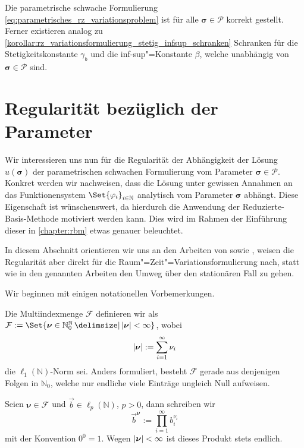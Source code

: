 \documentclass[../main.tex]{subfiles}
\begin{document}
\begin{Korollar}
\label{korollar:parametrisches_rz_variationsproblem_sachgemaess}
    Die parametrische schwache Formulierung \cref{eq:parametrisches_rz_variationsproblem} ist für alle $\bm\sigma \in \mathcal P$ korrekt gestellt.
    Ferner existieren analog zu \cref{korollar:rz_variationsformulierung_stetig_infsup_schranken} Schranken für die Stetigkeitskonstante $\gamma_{b}$ und die inf-sup"=Konstante $\beta$, welche unabhängig von $\bm \sigma \in \mathcal P$ sind.
\end{Korollar}


\section{Regularität bezüglich der Parameter} %
\label{section:regularitaet_bezueglich_der_parameter}

Wir interessieren uns nun für die Regularität der Abhängigkeit der Lösung $u(\bm\sigma)$ der parametrischen schwachen Formulierung vom Parameter $\bm \sigma \in \mathcal P$.
Konkret werden wir nachweisen, dass die Lösung unter gewissen Annahmen an das Funktionensystem $\Set{\varphi_{i}}_{i \in \mathbb{N}}$ analytisch vom Parameter $\bm \sigma$ abhängt.
Diese Eigenschaft ist wünschenswert, da hierdurch die Anwendung der Reduzierte-Basis-Methode motiviert werden kann.
Dies wird im Rahmen der Einführung dieser in \cref{chapter:rbm} etwas genauer beleuchtet.

In diesem Abschnitt orientieren wir uns an den Arbeiten von \textcite{Cohen:2010kz,Cohen:2011jp} sowie \textcite{Kunoth:2013ef}, weisen die Regularität aber direkt für die Raum"=Zeit"=Variationsformulierung nach, statt wie in den genannten Arbeiten den Umweg über den stationären Fall zu gehen.

Wir beginnen mit einigen notationellen Vorbemerkungen.
\begin{Bemerkung}
    Die Multiindexmenge $\mathcal F$ definieren wir als $\mathcal F := \Set{ \bm\nu \in \mathbb{N}^{\mathbb{N}}_{0} \given \abs{\bm\nu} < \infty }$, wobei
    \begin{equation}
        \lvert\bm\nu\rvert := \sum_{i = 1}^{\infty} \nu_{i}
    \end{equation}
    die $\ell_{1}(\mathbb{N})$-Norm sei.
    Anders formuliert, besteht $\mathcal F$ gerade aus denjenigen Folgen in $\mathbb{N}_{0}$, welche nur endliche viele Einträge ungleich Null aufweisen.

    Seien $\bm\nu \in \mathcal F$ und $\vec{b} \in \ell_{p}(\mathbb{N})$, $p > 0$, dann schreiben wir
    \begin{equation}
        \vec{b}^{\bm\nu} := \prod_{i = 1}^{\infty} b_{i}^{\nu_{i}}
    \end{equation}
    mit der Konvention $0^{0} = 1$.
    Wegen $\lvert\bm\nu\rvert < \infty$ ist dieses Produkt stets endlich.
\end{Bemerkung}
\end{document}
